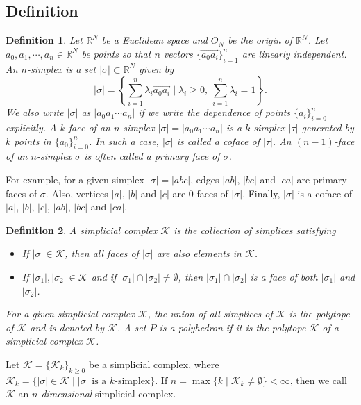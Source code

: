 \documentclass[a4paper,12pt]{article}
\newtheorem{definition}{Definition}[section]
\numberwithin{equation}{section}
\begin{document}
\subsection{Definition}
\begin{definition}\rm
Let $\mathbb{R}^N$ be a Euclidean space and $O_N$ be the origin of $\mathbb{R}^N$. Let $a_0,a_1,\cdots, a_n \in \mathbb{R}^N$ be points so that $n$ vectors $\{\overrightarrow{a_0a_i}\}_{i=1}^n$ are linearly independent.
An {\em $n$-simplex} is a set $|\sigma| \subset \mathbb{R}^N$ given by
\begin{equation*}
|\sigma| = \left\{\sum_{i=1}^n \lambda_i \overrightarrow{a_0a_i}\mid \lambda_i \geq 0,\ \sum_{i=1}^n \lambda_i = 1\right\}.
\end{equation*}
We also write $|\sigma|$ as $|a_0a_1 \cdots a_n|$ if we write the dependence of points $\{a_i\}_{i=0}^n$ explicitly.
A $k$-{\em face} of an $n$-simplex $|\sigma| = |a_0a_1\cdots a_n|$ is a $k$-simplex $|\tau|$ generated by $k$ points in $\{a_0\}_{i=0}^n$. In such a case, $|\sigma|$ is called {\em a coface} of $|\tau|$.
An $(n-1)$-face of an $n$-simplex $\sigma$ is often called {\em a primary face} of $\sigma$.
\end{definition}
For example, for a given simplex $|\sigma| = |abc|$, edges $|ab|$, $|bc|$ and $|ca|$ are primary faces of $\sigma$. Also, vertices $|a|$, $|b|$ and $|c|$ are $0$-faces of $|\sigma|$. Finally, $|\sigma|$ is a coface of $|a|$, $|b|$, $|c|$, $|ab|$, $|bc|$ and $|ca|$.

\begin{definition}\rm
A {\em simplicial complex} $\mathcal{K}$ is the collection of simplices satisfying
\begin{itemize}
\item If $|\sigma| \in \mathcal{K}$, then all faces of $|\sigma|$ are also elements in $\mathcal{K}$.
\item If $|\sigma_1|, |\sigma_2| \in \mathcal{K}$ and if $|\sigma_1|\cap |\sigma_2| \not = \emptyset$, then $|\sigma_1|\cap |\sigma_2|$ is a face of both $|\sigma_1|$ and $|\sigma_2|$. 
\end{itemize}
For a given simplicial complex $\mathcal{K}$, the union of all simplices of $\mathcal{K}$ is the {\em polytope} of $\mathcal{K}$ and is  denoted by $\mathcal{K}$. A set $P$ is a {\em polyhedron} if it is the polytope $\mathcal{K}$ of a simplicial complex $\mathcal{K}$.
\end{definition}


Let $\mathcal{K} = \{\mathcal{K}_k\}_{k\geq 0}$ be a simplicial complex, where $\mathcal{K}_k = \{|\sigma| \in \mathcal{K} \mid |\sigma| \text{ is a $k$-simplex}\}$. If $n = \max \{k \mid \mathcal{K}_k \not = \emptyset\} < \infty$, then we call $\mathcal{K}$ an {\em $n$-dimensional} simplicial complex. 
\end{document}

